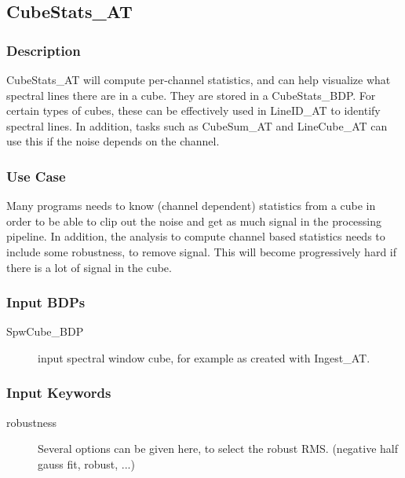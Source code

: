 
\subsection{CubeStats\_AT}

\subsubsection{Description}

CubeStats\_AT will compute per-channel statistics, and can help
visualize what spectral lines there are in a cube. 
They are stored in a CubeStats\_BDP.
For certain types of cubes, these can be effectively used in LineID\_AT to identify
spectral lines. In addition, tasks such as CubeSum\_AT and LineCube\_AT can use this if the noise
depends on the channel.


\subsubsection{Use Case}

Many programs needs to know (channel dependent) statistics from a cube in order to be able to
clip out the noise and get as much signal in the processing pipeline. In addition, the analysis
to compute channel based statistics needs to include some robustness, to remove signal. This
will become progressively hard if there is a lot of signal in the cube.

\subsubsection{Input BDPs}

\begin{description}

\item[SpwCube\_BDP] input spectral window cube, for example as created with Ingest\_AT.

\end{description}


\subsubsection{Input Keywords}

\begin{description}

\item[robustness] Several options can be given here, to select the robust RMS.
(negative half gauss fit, robust, ...)

\end{description}

